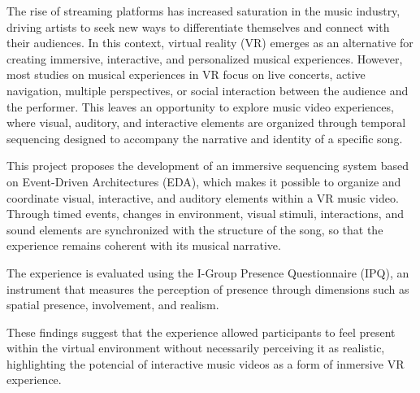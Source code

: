 The rise of streaming platforms has increased saturation in the music industry, driving artists to seek new ways to differentiate themselves and connect with their audiences. In this context, virtual reality (VR) emerges as an alternative for creating immersive, interactive, and personalized musical experiences. However, most studies on musical experiences in VR focus on live concerts, active navigation, multiple perspectives, or social interaction between the audience and the performer. This leaves an opportunity to explore music video experiences, where visual, auditory, and interactive elements are organized through temporal sequencing designed to accompany the narrative and identity of a specific song.

This project proposes the development of an immersive sequencing system based on Event-Driven Architectures (EDA), which makes it possible to organize and coordinate visual, interactive, and auditory elements within a VR music video. Through timed events, changes in environment, visual stimuli, interactions, and sound elements are synchronized with the structure of the song, so that the experience remains coherent with its musical narrative.

The experience is evaluated using the I-Group Presence Questionnaire (IPQ), an instrument that measures the perception of presence through dimensions such as spatial presence, involvement, and realism. 

These findings suggest that the experience allowed participants to feel present within the virtual environment without necessarily perceiving it as realistic, highlighting the potencial of interactive music videos as a form of inmersive VR experience.